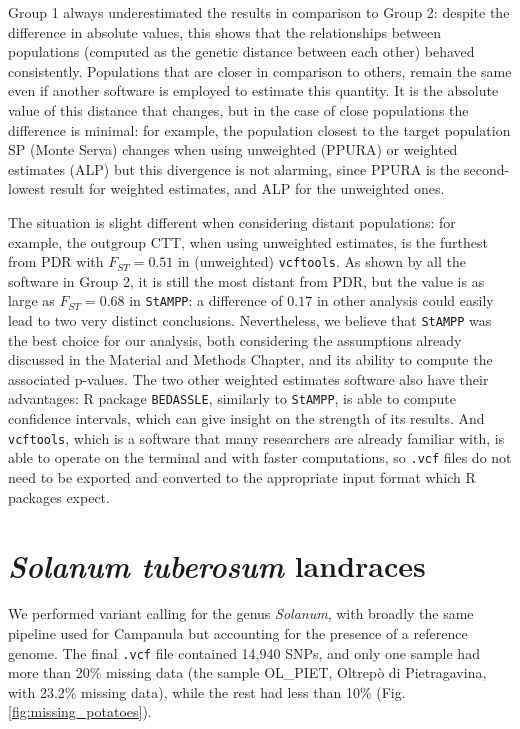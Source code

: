 \documentclass[a4paper, 12pt]{report}
\begin{document}
Group 1 always underestimated the results in comparison to Group 2: despite the difference in absolute values, this shows that the relationships between populations (computed as the genetic distance between each other) behaved consistently. Populations that are closer in comparison to others, remain the same even if another software is employed to estimate this quantity. It is the absolute value of this distance that changes, but in the case of close populations the difference is minimal: for example, the population closest to the target population SP (Monte Serva) changes when using unweighted (PPURA) or weighted estimates (ALP) but this divergence is not alarming, since PPURA is the second-lowest result for weighted estimates, and ALP for the unweighted ones. 

The situation is slight different when considering distant populations: for example, the outgroup CTT, when using unweighted estimates, is the furthest from PDR with $F_{ST} = 0.51$ in (unweighted) \texttt{vcftools}. As shown by all the software in Group 2, it is still the most distant from PDR, but the value is as large as $F_{ST} = 0.68$ in \texttt{StAMPP}: a difference of $0.17$ in other analysis could easily lead to two very distinct conclusions. Nevertheless, we believe that \texttt{StAMPP} was the best choice for our analysis, both considering the assumptions already discussed in the Material and Methods Chapter, and its ability to compute the associated p-values. The two other weighted estimates software also have their advantages: R package \texttt{BEDASSLE}, similarly to \texttt{StAMPP}, is able to compute confidence intervals, which can give insight on the strength of its results. And \texttt{vcftools}, which is a software that many researchers are already familiar with, is able to operate on the terminal and with faster computations, so \texttt{.vcf} files do not need to be exported and converted to the appropriate input format which R packages expect.

\clearpage
\section{\textit{Solanum tuberosum} landraces}
We performed variant calling for the genus \textit{Solanum}, with broadly the same pipeline used for Campanula but accounting for the presence of a reference genome. The final \texttt{.vcf} file contained 14,940 SNPs, and only one sample had more than 20\% missing data (the sample OL\_PIET, Oltrepò di Pietragavina, with 23.2\% missing data), while the rest had less than 10\% (Fig. \ref{fig:missing_potatoes}).
\end{document}
